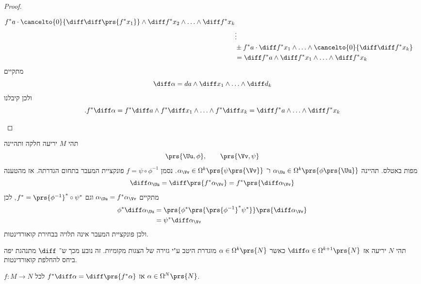 \documentclass[a4paper,10pt,twoside,openany]{book}
\begin{document}
\begin{proof}
\begin{itemize}
\begin{align*}
f^* a \cdot \cancelto{0}{\diff \diff \prs{f^* x_1}} \wedge \diff f^* x_2 \wedge \ldots \wedge \diff f^* x_k \\&\vdots \\&\pm
f^* a \cdot \diff f^* x_1 \wedge \ldots \wedge \cancelto{0}{\diff \diff f^* x_k} \\&=
\diff f^* a \wedge \diff f^* x_1 \wedge \ldots \wedge \diff f^* x_k
\end{align*}
מתקיים
\[\diff \alpha = d a \wedge \diff x_1 \wedge \ldots \wedge \diff d_k\]
ולכן קיבלנו
\[\text{.} f^* \diff \alpha = f^* \diff a \wedge f^* \diff x_1 \wedge \ldots \wedge f^* \diff x_k = \diff f^* a \wedge \ldots \wedge \diff f^* x_k\]
\end{itemize}
\end{proof}

\begin{remark}
תהי
$M$
יריעה חלקה ותהיינה
\[\prs{\Uu, \phi}, \qquad \prs{\Vv, \psi}\]
מפות באטלס.
תהיינה
$\alpha_{\Uu} \in \Omega^k\prs{\phi\prs{\Uu}}$
ו־%
$\alpha_{\Vv} \in \Omega^k\prs{\psi\prs{\Vv}}$.
נסמן
$f = \psi \circ \phi^{-1}$
פונקציית המעבר בתחום הגדרתה.
אז מהטענה
\[\diff \alpha_{\Uu} = \diff\prs{f^* \alpha_{\Vv}} = f^* \prs{\diff \alpha_{\Vv}}\]
מתקיים
$\alpha_{\Uu} = f^* \alpha_{\Vv}$
וגם
$f^* = \prs{\phi^{-1}}^* \circ \psi^*$,
לכן
\begin{align*}
\phi^* \diff \alpha_{\Uu} &= \prs{\phi^* \prs{\prs{\phi^{-1}}^* \psi^*}}\prs{\diff \alpha_{\Vv}} \\&=
\psi^* \diff \alpha_{\Vv}
\end{align*}
ולכן פונקציית המעבר אינה תלויה בבחירת קואורדינטות.
\end{remark}
\begin{corollary}
תהי
$N$
יריעה אז
$\diff \alpha \in \Omega^{k+1}\prs{N}$
כאשר
$\alpha \in \Omega^k\prs{N}$
מוגדרת היטב ע"י גזירה של הצגות מקומיות.
זה נובע מכך ש־%
$\diff$
מתנהגת יפה ביחס להחלפת קואורדינטות.
\end{corollary}
\begin{corollary}
$f\colon M \to N$
אז
$f^* \diff \alpha = \diff\prs{f^* \alpha}$
לכל
$\alpha \in \Omega^N\prs{N}$.
\end{corollary}
\end{document}

